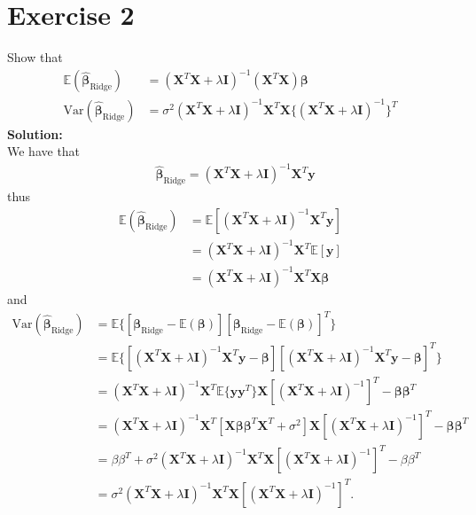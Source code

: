 \documentclass{article}
\begin{document}
	\section*{Exercise 2}
	Show that
	\begin{align*}
		\mathbb{E}(\hat{\bm \beta}_\text{Ridge})&=(\bm X^T\bm X+\lambda\bm I)^{-1}(\bm X^T\bm X)\bm\beta\\
		\text{Var}(\hat{\bm \beta}_\text{Ridge})&=\sigma^2(\bm X^T \bm X+\lambda\bm I)^{-1}\bm X^T\bm X\{(\bm X^T \bm X+\lambda\bm I)^{-1}\}^T
	\end{align*}
	\textbf{Solution:}\\
	We have that
	\begin{align*}
		&\hat{\bm \beta}_\text{Ridge}=(\bm{X}^T\bm{X}+\lambda\bm{I})^{-1}\bm{X}^T\bm{y}
	\end{align*}
	thus
	\begin{align*}
		\mathbb{E}(\hat{\bm \beta}_\text{Ridge})&=\mathbb{E}[(\bm{X}^T\bm{X}+\lambda\bm{I})^{-1}\bm{X}^T\bm{y}]\\
		&=(\bm{X}^T\bm{X}+\lambda\bm{I})^{-1}\bm{X}^T\mathbb{E}[\bm{y}]\\
		&=(\bm{X}^T\bm{X}+\lambda\bm{I})^{-1}\bm{X}^T\bm X\bm\beta
	\end{align*}
	and
	\begin{align*}
		\text{Var}(\hat{\bm \beta}_\text{Ridge})&=\mathbb E\{ [\bm\beta_\text{Ridge}-\mathbb E(\bm\beta)] [\bm\beta_\text{Ridge}-\mathbb E(\bm\beta)]^T\}\\
		&=\mathbb E\{ [(\bm{X}^T\bm{X}+\lambda\bm{I})^{-1}\bm{X}^T\bm{y}-\bm\beta][(\bm{X}^T\bm{X}+\lambda\bm{I})^{-1}\bm{X}^T\bm{y}-\bm\beta]^T\}\\
		&=(\bm X^T\bm X+\lambda\bm{I})^{-1}\bm X^T\mathbb E\{\bm y\bm y^T\}\bm X [(\bm X^T\bm X+\lambda\bm{I})^{-1}]^{T}-\bm\beta\bm\beta^T\\
		&=(\bm X^T\bm X+\lambda\bm{I})^{-1}\bm X^T[\bm X\bm\beta\bm\beta^T\bm X^T+\sigma^2]\bm X[(\bm X^T\bm X+\lambda\bm{I})^{-1}]^{T}-\bm\beta\bm\beta^T\\
		&= \beta\beta^T+ \sigma^2\left( \bm{X}^T \bm{X} + \lambda \bm{I} \right)^{-1} \bm{X}^T \bm{X} [\left( \bm{X}^T \bm{X} + \lambda \bm{I} \right)^{-1}]^{T}  - \beta\beta^T \\
		&= \sigma^2\left( \bm{X}^T \bm{X} + \lambda \bm{I} \right)^{-1} \bm{X}^T \bm{X} [\left( \bm{X}^T \bm{X} + \lambda \bm{I} \right)^{-1}]^{T}.
	\end{align*}
	
	
	
\end{document}
